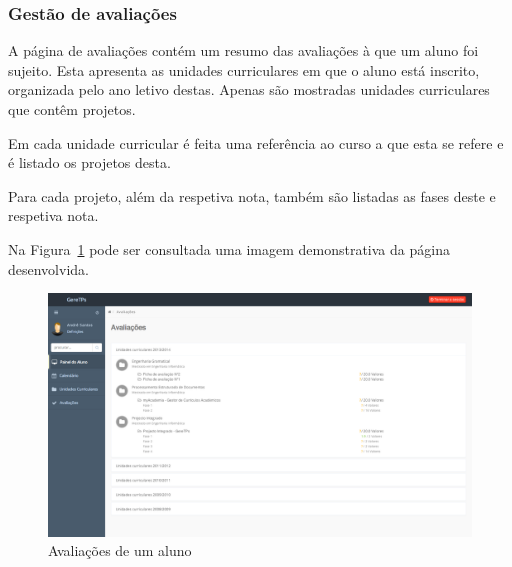 \subsubsection{Gestão de avaliações}

A página de avaliações contém um resumo das avaliações à que um aluno foi sujeito. Esta apresenta as unidades curriculares em que o aluno está inscrito, organizada pelo ano letivo destas. Apenas são mostradas unidades curriculares que contêm projetos.

Em cada unidade curricular é feita uma referência ao curso a que esta se refere e é listado os projetos desta.

Para cada projeto, além da respetiva nota, também são listadas as fases deste e respetiva nota.

Na Figura~\ref{fig:student_grades} pode ser consultada uma imagem demonstrativa da página desenvolvida.

\begin{figure}[H]
  \centering
  \includegraphics[width=1\textwidth,center]{images/implementacao/alunos/grades}
  \caption{Avaliações de um aluno}
  \label{fig:student_grades}
\end{figure}
